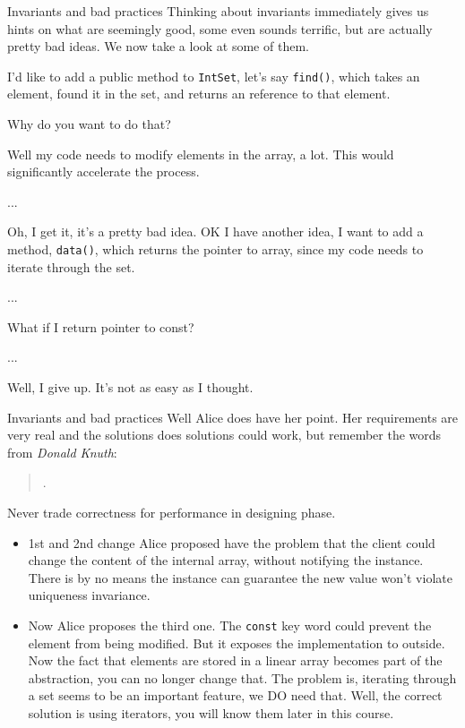 \begin{frame}{Invariants and bad practices}
Thinking about invariants immediately gives us hints on what are seemingly good, some even sounds terrific, but are actually pretty bad ideas. We now take a look at some of them.

\begin{description}[Alice]
	\small
	\item[Alice] I'd like to add a public method to \texttt{IntSet}, let's say \texttt{find()}, which takes an element, found it in the set, and returns an reference to that element. 
	\item [Bob] Why do you want to do that?
	\item [Alice] Well my code needs to modify elements in the array, a lot. This would significantly accelerate the process.
	\item [Bob] ...
	\item [Alice] Oh, I get it, it's a pretty bad idea. OK I have another idea, I want to add a method, \texttt{data()}, which returns the pointer to array, since my code needs to iterate through the set. 
	\item [Bob] ...
	\item [Alice] What if I return pointer to const?
	\item [Bob] ...
	\item [Alice] Well, I give up. It's not as easy as I thought.
\end{description}
\end{frame}

\begin{frame}{Invariants and bad practices}
Well Alice does have her point. Her requirements are very real and the solutions does solutions could work, but remember the words from \textit{Donald Knuth}:
\begin{quotation}
	.
\end{quotation}
Never trade correctness for performance in designing phase. 
\begin{itemize}
	\small
	\item 1st and 2nd change Alice proposed have the problem that the client could change the content of the internal array, without notifying the instance. There is by no means the instance can guarantee the new value won't violate uniqueness invariance.
	\item Now Alice proposes the third one. The \texttt{const} key word could prevent the element from being modified. But it exposes the implementation to outside. Now the fact that elements are stored in a linear array becomes part of the abstraction, you can no longer change that. The problem is, iterating through a set seems to be an important feature, we DO need that. Well, the correct solution is using iterators, you will know them later in this course.
\end{itemize} 
\end{frame}


